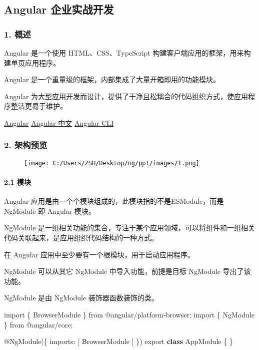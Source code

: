 \documentclass[
]{article}
\author{}
\date{}
\newenvironment{Shaded}{}{}
\newcommand{\DataTypeTok}[1]{\textcolor[rgb]{0.56,0.13,0.00}{#1}}
\newcommand{\FunctionTok}[1]{\textcolor[rgb]{0.02,0.16,0.49}{#1}}
\newcommand{\ImportTok}[1]{#1}
\newcommand{\KeywordTok}[1]{\textcolor[rgb]{0.00,0.44,0.13}{\textbf{#1}}}
\newcommand{\NormalTok}[1]{#1}
\newcommand{\OperatorTok}[1]{\textcolor[rgb]{0.40,0.40,0.40}{#1}}
\newcommand{\StringTok}[1]{\textcolor[rgb]{0.25,0.44,0.63}{#1}}
\begin{document}
\hypertarget{angular-ux4f01ux4e1aux5b9eux6218ux5f00ux53d1}{%
\subsection{Angular
企业实战开发}\label{angular-ux4f01ux4e1aux5b9eux6218ux5f00ux53d1}}

\hypertarget{1--ux6982ux8ff0}{%
\subsubsection{1. 概述}\label{1--ux6982ux8ff0}}

Angular 是一个使用 HTML、CSS、TypeScript
构建客户端应用的框架，用来构建单页应用程序。

Angular 是一个重量级的框架，内部集成了大量开箱即用的功能模块。

Angular
为大型应用开发而设计，提供了干净且松耦合的代码组织方式，使应用程序整洁更易于维护。

\href{https://angular.io/}{Angular} \href{https://angular.cn/}{Angular
中文} \href{https://cli.angular.io/}{Angular CLI}

\hypertarget{2-ux67b6ux6784ux9884ux89c8}{%
\subsubsection{2. 架构预览}\label{2-ux67b6ux6784ux9884ux89c8}}

\begin{figure}
\centering
\texttt{[image: C:/Users/ZSH/Desktop/ng/ppt/images/1.png]}
\caption{}
\end{figure}

\hypertarget{21-ux6a21ux5757}{%
\paragraph{2.1 模块}\label{21-ux6a21ux5757}}

Angular 应用是由一个个模块组成的，此模块指的不是ESModule，而是 NgModule
即 Angular 模块。

NgModule
是一组相关功能的集合，专注于某个应用领域，可以将组件和一组相关代码关联起来，是应用组织代码结构的一种方式。

在 Angular 应用中至少要有一个根模块，用于启动应用程序。

NgModule 可以从其它 NgModule 中导入功能，前提是目标 NgModule
导出了该功能。

NgModule 是由 NgModule 装饰器函数装饰的类。

\begin{Shaded}
\begin{Highlighting}[]
\ImportTok{import}\NormalTok{ \{ BrowserModule \} }\ImportTok{from} \StringTok{\textquotesingle{}@angular/platform{-}browser\textquotesingle{}}\OperatorTok{;}
\ImportTok{import}\NormalTok{ \{ NgModule \} }\ImportTok{from} \StringTok{\textquotesingle{}@angular/core\textquotesingle{}}\OperatorTok{;}

\NormalTok{@}\FunctionTok{NgModule}\NormalTok{(\{}
  \DataTypeTok{imports}\OperatorTok{:}\NormalTok{ [}
\NormalTok{    BrowserModule}
\NormalTok{  ]}
\NormalTok{\})}
\ImportTok{export} \KeywordTok{class}\NormalTok{ AppModule \{ \}}
\end{Highlighting}
\end{Shaded}
\end{document}
